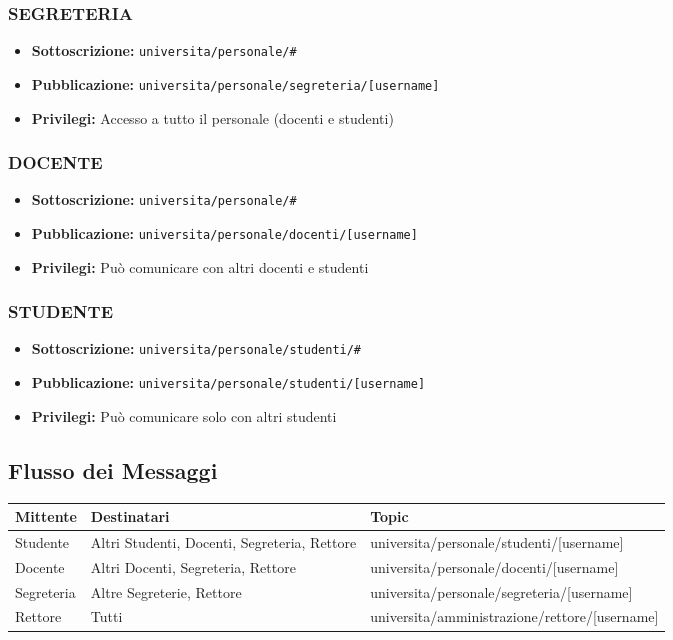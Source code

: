 \documentclass[12pt,a4paper]{article}
\begin{document}
\subsubsection{SEGRETERIA}
\begin{itemize}
    \item \textbf{Sottoscrizione:} \texttt{universita/personale/\#}
    \item \textbf{Pubblicazione:} \texttt{universita/personale/segreteria/[username]}
    \item \textbf{Privilegi:} Accesso a tutto il personale (docenti e studenti)
\end{itemize}

\subsubsection{DOCENTE}
\begin{itemize}
    \item \textbf{Sottoscrizione:} \texttt{universita/personale/\#}
    \item \textbf{Pubblicazione:} \texttt{universita/personale/docenti/[username]}
    \item \textbf{Privilegi:} Può comunicare con altri docenti e studenti
\end{itemize}

\subsubsection{STUDENTE}
\begin{itemize}
    \item \textbf{Sottoscrizione:} \texttt{universita/personale/studenti/\#}
    \item \textbf{Pubblicazione:} \texttt{universita/personale/studenti/[username]}
    \item \textbf{Privilegi:} Può comunicare solo con altri studenti
\end{itemize}

\subsection{Flusso dei Messaggi}

\begin{longtable}{|p{3cm}|p{5cm}|p{6cm}|}
\hline
\textbf{Mittente} & \textbf{Destinatari} & \textbf{Topic} \\
\hline
Studente & Altri Studenti, Docenti, Segreteria, Rettore & universita/personale/studenti/[username] \\
\hline
Docente & Altri Docenti, Segreteria, Rettore & universita/personale/docenti/[username] \\
\hline
Segreteria & Altre Segreterie, Rettore & universita/personale/segreteria/[username] \\
\hline
Rettore & Tutti & universita/amministrazione/rettore/[username] \\
\hline
\end{longtable}
\end{document}
